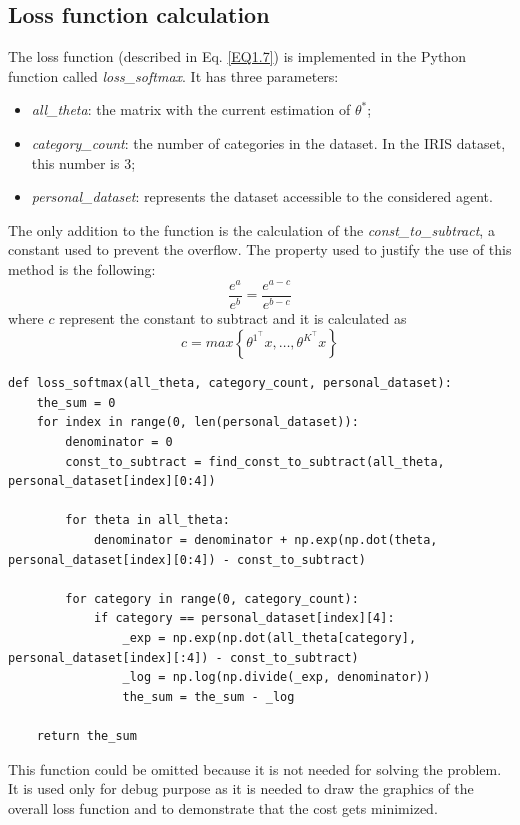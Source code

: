 \documentclass[a4paper,11pt,oneside]{book}
\begin{document}
\subsection{Loss function calculation}
The loss function (described in Eq. \ref{EQ1.7}) is implemented in the Python function called \textit{loss\_softmax}. It has three parameters:\\
\begin{itemize}
	\item \textit{all\_theta}: the matrix with the current estimation of $\theta^*$;
	\item \textit{category\_count}: the number of categories in the dataset. In the IRIS dataset, this number is $3$;
	\item \textit{personal\_dataset}: represents the dataset accessible to the considered agent.
\end{itemize}
The only addition to the function is the calculation of the \textit{const\_to\_subtract}, a constant used to prevent the overflow. The property used to justify the use of this method is the following:
\begin{equation}
	\dfrac{e^a}{e^b} = \dfrac{e^{a-c}}{e^{b-c}}
\end{equation}
where $c$ represent the constant to subtract and it is calculated as
\begin{equation}
	c = max \left\{ \theta^{1^\top}x, \dots,  \theta^{K^\top}x \right\}
\end{equation}

\begin{lstlisting}
def loss_softmax(all_theta, category_count, personal_dataset):
    the_sum = 0
    for index in range(0, len(personal_dataset)):
        denominator = 0
        const_to_subtract = find_const_to_subtract(all_theta, personal_dataset[index][0:4])
		
        for theta in all_theta:
            denominator = denominator + np.exp(np.dot(theta, personal_dataset[index][0:4]) - const_to_subtract)
		
        for category in range(0, category_count):
            if category == personal_dataset[index][4]:
                _exp = np.exp(np.dot(all_theta[category], personal_dataset[index][:4]) - const_to_subtract)
                _log = np.log(np.divide(_exp, denominator))
                the_sum = the_sum - _log
	
	return the_sum
\end{lstlisting}

This function could be omitted because it is not needed for solving the problem. It is used only for debug purpose as it is needed to draw the graphics of the overall loss function and to demonstrate that the cost gets minimized.
\end{document}
